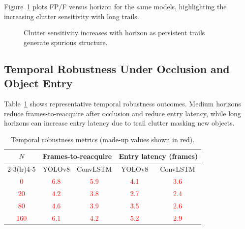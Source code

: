 \documentclass[twocolumn, 10pt]{article}
\newcommand{\ph}[1]{\textcolor{red}{#1}}
\begin{document}
Figure~\ref{fig:fp_plot} plots FP/F versus horizon for the same models, highlighting the increasing clutter sensitivity with long trails.

\begin{figure}[t]
\centering
{}
\caption{Clutter sensitivity increases with horizon as persistent trails generate spurious structure.}
\label{fig:fp_plot}
\end{figure}

\subsection{Temporal Robustness Under Occlusion and Object Entry}
Table~\ref{tab:temporal_metrics} shows representative temporal robustness outcomes. Medium horizons reduce frames-to-reacquire after occlusion and reduce entry latency, while long horizons can increase entry latency due to trail clutter masking new objects.

\begin{table}[t]
\centering
\caption{Temporal robustness metrics (made-up values shown in red).}
\label{tab:temporal_metrics}
\begin{tabular}{@{}ccccc@{}}
\toprule
\multirow{2}{*}{$N$} & \multicolumn{2}{c}{Frames-to-reacquire} & \multicolumn{2}{c}{Entry latency (frames)} \\
\cmidrule(lr){2-3}\cmidrule(lr){4-5}
 & YOLOv8 & ConvLSTM & YOLOv8 & ConvLSTM \\
\midrule
\ph{0}   & \ph{6.8} & \ph{5.9} & \ph{4.1} & \ph{3.6} \\
\ph{20}  & \ph{4.2} & \ph{3.8} & \ph{2.7} & \ph{2.4} \\
\ph{80}  & \ph{4.6} & \ph{3.9} & \ph{3.5} & \ph{2.6} \\
\ph{160} & \ph{6.1} & \ph{4.2} & \ph{5.2} & \ph{2.9} \\
\bottomrule
\end{tabular}
\end{table}
\end{document}
